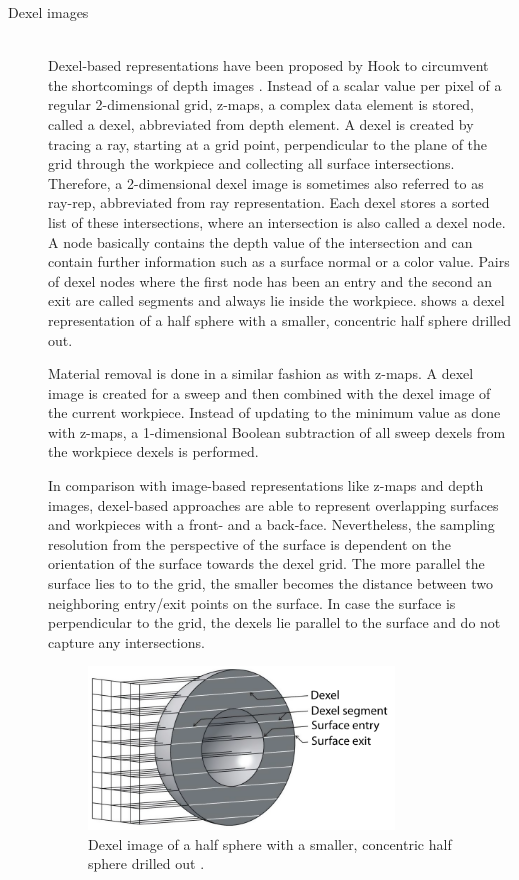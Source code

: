 \begin{description}
	\item[Dexel images] \hfill \\
	Dexel-based representations have been proposed by Hook to circumvent the shortcomings of depth images \cite{dexel}.
	Instead of a scalar value per pixel of a regular 2-dimensional grid, z-maps, a complex data element is stored, called a dexel, abbreviated from depth element.
	A dexel is created by tracing a ray, starting at a grid point, perpendicular to the plane of the grid through the workpiece and collecting all surface intersections.
	Therefore, a 2-dimensional dexel image is sometimes also referred to as ray-rep, abbreviated from ray representation.
	Each dexel stores a sorted list of these intersections, where an intersection is also called a dexel node.
	A node basically contains the depth value of the intersection and can contain further information such as a surface normal or a color value.
	Pairs of dexel nodes where the first node has been an entry and the second an exit are called segments and always lie inside the workpiece.
	 shows a dexel representation of a half sphere with a smaller, concentric half sphere drilled out.

	Material removal is done in a similar fashion as with z-maps.
	A dexel image is created for a sweep and then combined with the dexel image of the current workpiece.
	Instead of updating to the minimum value as done with z-maps, a 1-dimensional Boolean subtraction of all sweep dexels from the workpiece dexels is performed.

	In comparison with image-based representations like z-maps and depth images, dexel-based approaches are able to represent overlapping surfaces and workpieces with a front- and a back-face.
	Nevertheless, the sampling resolution from the perspective of the surface is dependent on the orientation of the surface towards the dexel grid.
	The more parallel the surface lies to to the grid, the smaller becomes the distance between two neighboring entry/exit points on the surface.
	In case the surface is perpendicular to the grid, the dexels lie parallel to the surface and do not capture any intersections.

	\begin{figure}[H]
		\centering
		\includegraphics[width=0.8\textwidth]{images/dexels}
		\caption[Dexel image]{
			Dexel image of a half sphere with a smaller, concentric half sphere drilled out \cite{virtual_machining_review}.
		}
		\label{fig:dexel_image}
	\end{figure}



\end{description}
